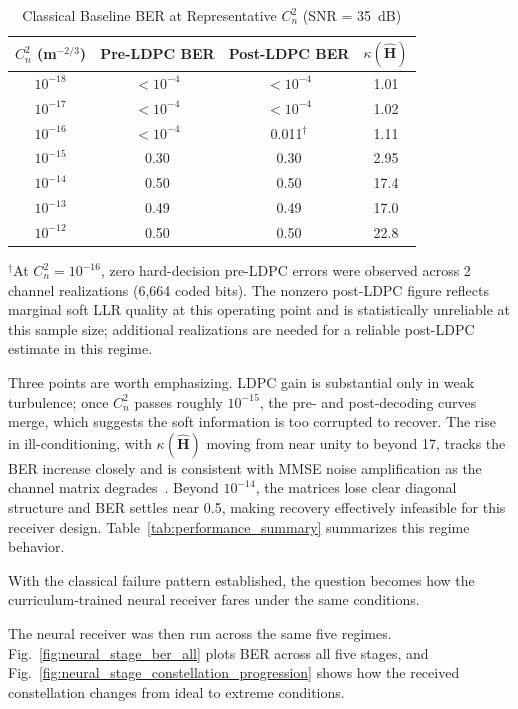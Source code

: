 \documentclass[journal]{IEEEtran}
\begin{document}
\begin{table}[htbp]
\centering
\caption{Classical Baseline BER at Representative $C_n^2$ (SNR = 35~dB)}
\label{tab:ber_key}
\small
\renewcommand{\arraystretch}{1.1}
\begin{tabular}{c c c c}
\toprule
$C_n^2$ (m$^{-2/3}$) & Pre-LDPC BER & Post-LDPC BER & $\kappa(\hat{\mathbf{H}})$ \\
\midrule
$10^{-18}$ & $<10^{-4}$ & $<10^{-4}$ & 1.01 \\
$10^{-17}$ & $<10^{-4}$ & $<10^{-4}$ & 1.02 \\
$10^{-16}$ & $<10^{-4}$ & 0.011$^\dagger$ & 1.11 \\
$10^{-15}$ & 0.30 & 0.30 & 2.95 \\
$10^{-14}$ & 0.50 & 0.50 & 17.4 \\
$10^{-13}$ & 0.49 & 0.49 & 17.0 \\
$10^{-12}$ & 0.50 & 0.50 & 22.8 \\
\bottomrule
\end{tabular}
\vspace{1mm}
{\footnotesize $^\dagger$At $C_n^2=10^{-16}$, zero hard-decision pre-LDPC errors were observed across 2 channel realizations (6{,}664 coded bits). The nonzero post-LDPC figure reflects marginal soft LLR quality at this operating point and is statistically unreliable at this sample size; additional realizations are needed for a reliable post-LDPC estimate in this regime.}
\end{table}


Three points are worth emphasizing. LDPC gain is substantial only in weak turbulence; once $C_n^2$ passes roughly $10^{-15}$, the pre- and post-decoding curves merge, which suggests the soft information is too corrupted to recover. The rise in ill-conditioning, with $\kappa(\hat{\mathbf{H}})$ moving from near unity to beyond 17, tracks the BER increase closely and is consistent with MMSE noise amplification as the channel matrix degrades~\cite{kay1993fundamentals, ren2014mimo_oam}. Beyond $10^{-14}$, the matrices lose clear diagonal structure and BER settles near 0.5, making recovery effectively infeasible for this receiver design. Table~\ref{tab:performance_summary} summarizes this regime behavior.

With the classical failure pattern established, the question becomes how the curriculum-trained neural receiver fares under the same conditions.

The neural receiver was then run across the same five regimes. Fig.~\ref{fig:neural_stage_ber_all} plots BER across all five stages, and Fig.~\ref{fig:neural_stage_constellation_progression} shows how the received constellation changes from ideal to extreme conditions.
\end{document}
